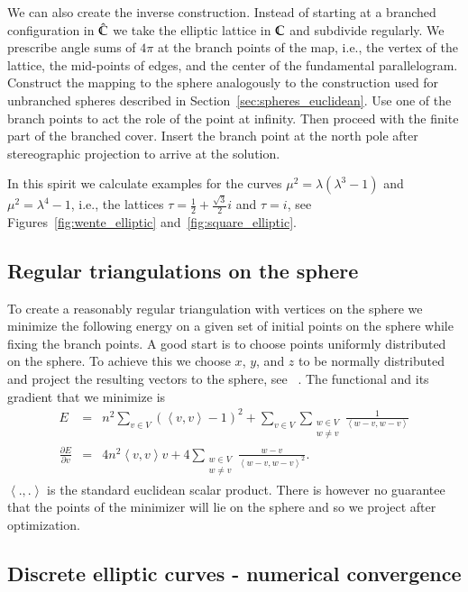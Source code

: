 \documentclass[Thesis]{subfiles}
\begin{document}
We can also create the inverse construction. 
Instead of starting at a branched configuration in $\hat {\mathbb C}$ we take the elliptic lattice in $\mathbb C$ and subdivide regularly.
We prescribe angle sums of $4\pi$ at the branch points of the map, i.e., the vertex of the lattice, the mid-points of edges, and the center of the fundamental parallelogram.
Construct the mapping to the sphere analogously to the construction used for unbranched spheres described in Section~\ref{sec:spheres_euclidean}.
Use one of the branch points to act the role of the point at infinity.
Then proceed with the finite part of the branched cover.
Insert the branch point at the north pole after stereographic projection to arrive at the solution.

In this spirit we calculate examples for the curves $\mu^2=\lambda(\lambda^3-1)$ and $\mu^2=\lambda^4-1$, i.e., the lattices $\tau=\frac{1}{2}+\frac{\sqrt 3}{2}i$ and $\tau=i$, see Figures~\ref{fig:wente_elliptic} and~\ref{fig:square_elliptic}.

\subsection{Regular triangulations on the sphere}
\label{sec:spherical_triangulations}

To create a reasonably regular triangulation with vertices on the sphere we minimize the following energy on a given set of initial points on the sphere while fixing the branch points. 
A good start is to choose points uniformly distributed on the sphere. 
To achieve this we choose $x$, $y$, and $z$ to be normally distributed and project the resulting vectors to the sphere, see~ \cite{Muller1959}. 
The functional and its gradient that we minimize is
\begin{eqnarray*}
E &=& n^2\sum_{v\in V}\left( \left<v,v\right> - 1\right)^2 + \sum_{v\in V}\sum_{\substack{w\in V\\w\neq v}} \frac{1}{\left<w-v, w-v\right>}\\ 
\frac{\partial E}{\partial v} &=& 4n^2\left<v,v\right>v + 4\sum_{\substack{w\in V\\w\neq v}}\frac{w-v}{\left<w-v,w-v\right>^2}.
\end{eqnarray*}
$\left<.,.\right>$ is the standard euclidean scalar product. There is however no guarantee that the points of the minimizer will lie on the sphere and so we project after optimization.

\subsection{Discrete elliptic curves - numerical convergence}
\label{sec:numerical_convergence}
\end{document}
